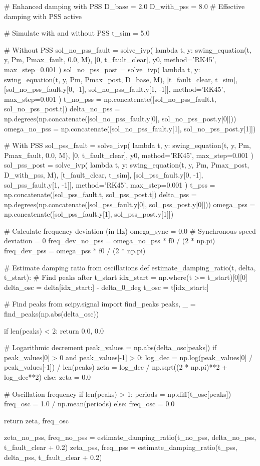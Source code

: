 \documentclass[11pt,a4paper]{article}
\begin{document}
\begin{pycode}
# Enhanced damping with PSS
D_base = 2.0
D_with_pss = 8.0  # Effective damping with PSS active

# Simulate with and without PSS
t_sim = 5.0

# Without PSS
sol_no_pss_fault = solve_ivp(
    lambda t, y: swing_equation(t, y, Pm, Pmax_fault, 0.0, M),
    [0, t_fault_clear], y0, method='RK45', max_step=0.001
)
sol_no_pss_post = solve_ivp(
    lambda t, y: swing_equation(t, y, Pm, Pmax_post, D_base, M),
    [t_fault_clear, t_sim], [sol_no_pss_fault.y[0, -1], sol_no_pss_fault.y[1, -1]],
    method='RK45', max_step=0.001
)
t_no_pss = np.concatenate([sol_no_pss_fault.t, sol_no_pss_post.t])
delta_no_pss = np.degrees(np.concatenate([sol_no_pss_fault.y[0], sol_no_pss_post.y[0]]))
omega_no_pss = np.concatenate([sol_no_pss_fault.y[1], sol_no_pss_post.y[1]])

# With PSS
sol_pss_fault = solve_ivp(
    lambda t, y: swing_equation(t, y, Pm, Pmax_fault, 0.0, M),
    [0, t_fault_clear], y0, method='RK45', max_step=0.001
)
sol_pss_post = solve_ivp(
    lambda t, y: swing_equation(t, y, Pm, Pmax_post, D_with_pss, M),
    [t_fault_clear, t_sim], [sol_pss_fault.y[0, -1], sol_pss_fault.y[1, -1]],
    method='RK45', max_step=0.001
)
t_pss = np.concatenate([sol_pss_fault.t, sol_pss_post.t])
delta_pss = np.degrees(np.concatenate([sol_pss_fault.y[0], sol_pss_post.y[0]]))
omega_pss = np.concatenate([sol_pss_fault.y[1], sol_pss_post.y[1]])

# Calculate frequency deviation (in Hz)
omega_sync = 0.0  # Synchronous speed deviation = 0
freq_dev_no_pss = omega_no_pss * f0 / (2 * np.pi)
freq_dev_pss = omega_pss * f0 / (2 * np.pi)

# Estimate damping ratio from oscillations
def estimate_damping_ratio(t, delta, t_start):
    # Find peaks after t_start
    idx_start = np.where(t >= t_start)[0][0]
    delta_osc = delta[idx_start:] - delta_0_deg
    t_osc = t[idx_start:]

    # Find peaks
    from scipy.signal import find_peaks
    peaks, _ = find_peaks(np.abs(delta_osc))

    if len(peaks) < 2:
        return 0.0, 0.0

    # Logarithmic decrement
    peak_values = np.abs(delta_osc[peaks])
    if peak_values[0] > 0 and peak_values[-1] > 0:
        log_dec = np.log(peak_values[0] / peak_values[-1]) / len(peaks)
        zeta = log_dec / np.sqrt((2 * np.pi)**2 + log_dec**2)
    else:
        zeta = 0.0

    # Oscillation frequency
    if len(peaks) > 1:
        periods = np.diff(t_osc[peaks])
        freq_osc = 1.0 / np.mean(periods)
    else:
        freq_osc = 0.0

    return zeta, freq_osc

zeta_no_pss, freq_no_pss = estimate_damping_ratio(t_no_pss, delta_no_pss, t_fault_clear + 0.2)
zeta_pss, freq_pss = estimate_damping_ratio(t_pss, delta_pss, t_fault_clear + 0.2)
\end{pycode}
\end{document}
